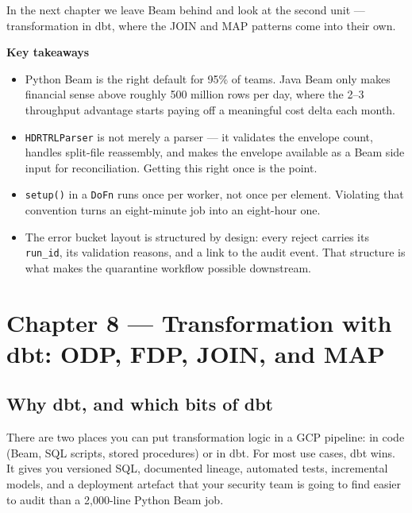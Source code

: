 \documentclass[
  11pt,
  british,
  oneside]{book}
\begin{document}
In the next chapter we leave Beam behind and look at the second unit ---
transformation in dbt, where the JOIN and MAP patterns come into their
own.

\begin{takeaways}
\textbf{Key takeaways}
\begin{itemize}
  \item Python Beam is the right default for 95\% of teams. Java Beam only makes financial sense above roughly 500 million rows per day, where the 2–3\texttimes{} throughput advantage starts paying off a meaningful cost delta each month.
  \item \texttt{HDRTRLParser} is not merely a parser — it validates the envelope count, handles split-file reassembly, and makes the envelope available as a Beam side input for reconciliation. Getting this right once is the point.
  \item \texttt{setup()} in a \texttt{DoFn} runs once per worker, not once per element. Violating that convention turns an eight-minute job into an eight-hour one.
  \item The error bucket layout is structured by design: every reject carries its \texttt{run\_id}, its validation reasons, and a link to the audit event. That structure is what makes the quarantine workflow possible downstream.
\end{itemize}
\end{takeaways}

\newpage

\hypertarget{chapter-8-transformation-with-dbt-odp-fdp-join-and-map}{%
\chapter{Chapter 8 --- Transformation with dbt: ODP, FDP, JOIN, and
MAP}\label{chapter-8-transformation-with-dbt-odp-fdp-join-and-map}}

\hypertarget{why-dbt-and-which-bits-of-dbt}{%
\section{Why dbt, and which bits of
dbt}\label{why-dbt-and-which-bits-of-dbt}}

There are two places you can put transformation logic in a GCP pipeline:
in code (Beam, SQL scripts, stored procedures) or in dbt. For
most use cases, dbt wins. It gives you versioned SQL, documented
lineage, automated tests, incremental models, and a deployment artefact
that your security team is going to find easier to audit than a
2,000-line Python Beam job.
\end{document}
